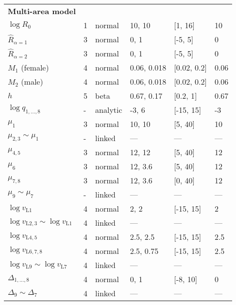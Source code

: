 \documentclass[11pt]{book}
\begin{document}
\begin{longtable}{L{1.3in}C{0.8in}C{1.0in}C{1.4in}C{0.9in}C{1.0in}}
\textbf{Multi-area model}      &   &           &                   &             &\\
$\log R_0$                     & 1 & normal    & 10, 10            & [1, 16]     &  10\\
$\widehat{R}_{\alpha=1}$       & 3 & normal    & 0, 1              & [-5, 5]     &  0\\
$\widehat{R}_{\alpha=2}$       & 3 & normal    & 0, 1              & [-5, 5]     &  0\\
$M_{1}$ (female)               & 4 & normal    & 0.06, 0.018       & [0.02, 0.2] &  0.06\\
$M_{2}$ (male)                 & 4 & normal    & 0.06, 0.018       & [0.02, 0.2] &  0.06\\
$h$                            & 5 & beta      & 0.67, 0.17        & [0.2, 1]    &  0.67\\
$\log q_{1,...,8}$             & - & analytic  & -3,   6           & [-15, 15]   & -3\\
$\mu_{1}$                      & 3 & normal    & 10, 10            & [5, 40]     & 10\\
$\mu_{2,3} \sim \mu_{1}$       & - & linked    & ---               & ---         & ---\\
$\mu_{4,5}$                    & 3 & normal    & 12, 12            & [5, 40]     & 12\\
$\mu_{6}$                      & 3 & normal    & 12, 3.6           & [5, 40]     & 12\\
$\mu_{7,8}$                    & 3 & normal    & 12, 3.6           & [0, 40]     & 12\\
$\mu_{9} \sim \mu_{7}$         & - & linked    & ---               & ---         & ---\\
$\log v_{\text{L}1}$           & 4 & normal    & 2, 2              & [-15, 15]   & 2\\
$\log v_{\text{L}2,3} \sim \log v_{\text{L}1}$ & 4 & linked        & ---  & ---  & ---\\
$\log v_{\text{L}4,5}$         & 4 & normal    & 2.5, 2.5          & [-15, 15]   & 2.5\\
$\log v_{\text{L}6,7,8}$       & 4 & normal    & 2.5, 0.75         & [-15, 15]   & 2.5\\
$\log v_{\text{L}9} \sim \log v_{\text{L}7}$   & 4 & linked        & ---  & ---  & ---\\
$\Delta_{1,...,8}$             & 4 & normal    & 0, 1              & [-8, 10]    & 0\\
$\Delta_{9} \sim \Delta_{7}$   & 4 & linked    & ---               & ---         & ---\\
\hline  
\end{longtable}
\end{document}
